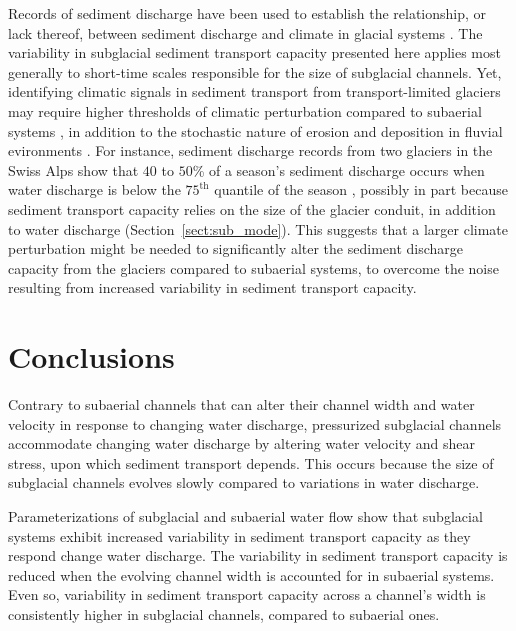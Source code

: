 \documentclass[11pt]{article}
\begin{document}
\begin{spacing}{1}
  Records of sediment discharge have been used to establish the relationship, or lack thereof, between sediment discharge and climate in glacial systems \citep[e.g.][]{koppes2009a,willenbring2016,mariotti2021}.
  The variability in subglacial sediment transport capacity presented here applies most generally to short-time scales responsible for the size of subglacial channels.
  Yet, identifying climatic signals in sediment transport from transport-limited glaciers may require higher thresholds of climatic perturbation compared to subaerial systems \citep{tofelde2021}, in addition to the stochastic nature of erosion and deposition in fluvial evironments \citep{castletort2003,jerolmack2010,romans2016}.
  For instance, sediment discharge records from two glaciers in the Swiss Alps show that $40$ to $50$\% of a season's sediment discharge occurs when water discharge is below the $75^{\mathrm{th}}$ quantile of the season \citep{delaney2018}, possibly in part because sediment transport capacity relies on the size of the glacier conduit, in addition to water discharge (Section~\ref{sect:sub_mode}).
  This suggests that a larger climate perturbation might be needed to significantly alter the sediment discharge capacity from the glaciers compared to subaerial systems, to overcome the noise resulting from increased variability in sediment transport capacity.

  \section{Conclusions}
  Contrary to subaerial channels that can alter their channel width and water velocity in response to changing water discharge,
   pressurized subglacial channels accommodate changing water discharge by altering water velocity and shear stress, upon which sediment transport depends.
  This occurs because the size of subglacial channels evolves slowly compared to variations in water discharge.
 
  Parameterizations of subglacial and subaerial water flow show that subglacial systems exhibit increased variability in sediment transport capacity as they respond change water discharge.
  The variability in sediment transport capacity is reduced when the evolving channel width is accounted for in subaerial systems.
  Even so, variability in sediment transport capacity across a channel's width is consistently higher in subglacial channels, compared to subaerial ones.
  

\end{spacing}
\end{document}
